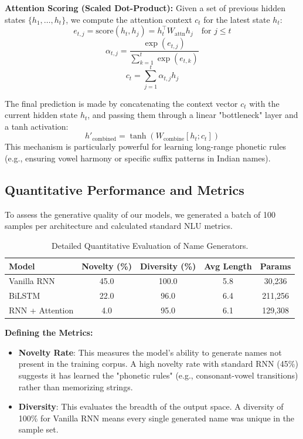 \documentclass[12pt,a4paper]{article}
\begin{document}
\textbf{Attention Scoring (Scaled Dot-Product):}
Given a set of previous hidden states $\{h_1, \ldots, h_t\}$, we compute the attention context $c_t$ for the latest state $h_t$:
\begin{equation}
    e_{t,j} = \text{score}(h_t, h_j) = h_t^\top W_{\text{attn}} h_j \quad \text{for } j \leq t
\end{equation}
\begin{equation}
    \alpha_{t,j} = \frac{\exp(e_{t,j})}{\sum_{k=1}^t \exp(e_{t,k})}
\end{equation}
\begin{equation}
    c_t = \sum_{j=1}^t \alpha_{t,j} h_j
\end{equation}

The final prediction is made by concatenating the context vector $c_t$ with the current hidden state $h_t$, and passing them through a linear "bottleneck" layer and a tanh activation:
\begin{equation}
    h'_{\text{combined}} = \tanh(W_{\text{combine}} [h_t; c_t])
\end{equation}
This mechanism is particularly powerful for learning long-range phonetic rules (e.g., ensuring vowel harmony or specific suffix patterns in Indian names).

\subsection{Quantitative Performance and Metrics}
To assess the generative quality of our models, we generated a batch of 100 samples per architecture and calculated standard NLU metrics.

\begin{table}[H]
\centering
\caption{Detailed Quantitative Evaluation of Name Generators.}
\label{tab:quant_full}
\begin{tabular}{lcccc}
\toprule
\textbf{Model} & \textbf{Novelty (\%)} & \textbf{Diversity (\%)} & \textbf{Avg Length} & \textbf{Params} \\
\midrule
Vanilla RNN     & 45.0 & 100.0 & 5.8 & 30,236 \\
BiLSTM          & 22.0 & 96.0 & 6.4 & 211,256 \\
RNN + Attention & 4.0  & 95.0 & 6.1 & 129,308 \\
\bottomrule
\end{tabular}
\end{table}

\textbf{Defining the Metrics:}
\begin{itemize}
    \item \textbf{Novelty Rate}: This measures the model's ability to generate names not present in the training corpus. A high novelty rate with standard RNN (45\%) suggests it has learned the "phonetic rules" (e.g., consonant-vowel transitions) rather than memorizing strings.
    \item \textbf{Diversity}: This evaluates the breadth of the output space. A diversity of 100\% for Vanilla RNN means every single generated name was unique in the sample set.
\end{itemize}
\end{document}
